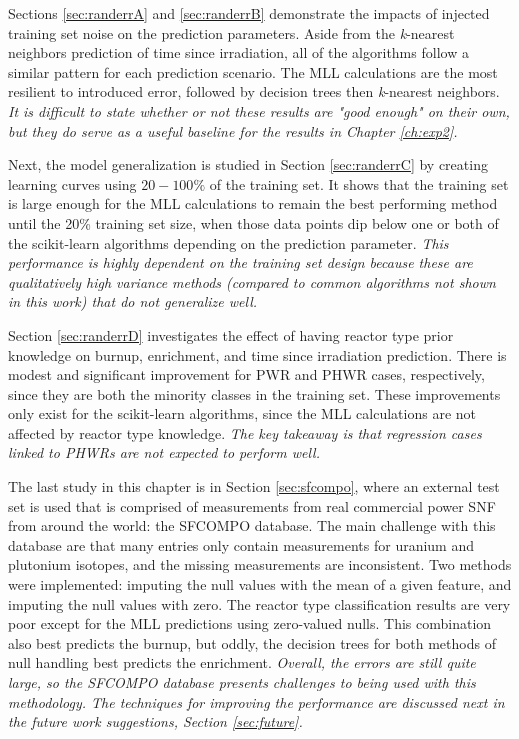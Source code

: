 Sections \ref{sec:randerrA} and \ref{sec:randerrB} demonstrate the impacts of
injected training set noise on the prediction parameters. Aside from the
\textit{k}-nearest neighbors prediction of time since irradiation, all of the
algorithms follow a similar pattern for each prediction scenario.  The
\gls{MLL} calculations are the most resilient to introduced error, followed by
decision trees then \textit{k}-nearest neighbors.  \textit{It is difficult to
state whether or not these results are "good enough" on their own, but they do
serve as a useful baseline for the results in Chapter \ref{ch:exp2}.} 

Next, the model generalization is studied in Section \ref{sec:randerrC} by
creating learning curves using $20-100\%$ of the training set.  It shows that
the training set is large enough for the \gls{MLL} calculations to remain the
best performing method until the 20\% training set size, when those data points
dip below one or both of the scikit-learn algorithms depending on the
prediction parameter.  \textit{This performance is highly dependent on the
training set design because these are qualitatively high variance methods
(compared to common algorithms not shown in this work) that do not generalize
well.}

Section \ref{sec:randerrD} investigates the effect of having reactor type prior
knowledge on burnup, enrichment, and time since irradiation prediction.  There
is modest and significant improvement for \gls{PWR} and \gls{PHWR} cases,
respectively, since they are both the minority classes in the training set.
These improvements only exist for the scikit-learn algorithms, since the
\gls{MLL} calculations are not affected by reactor type knowledge. \textit{The
key takeaway is that regression cases linked to \glspl{PHWR} are not expected
to perform well.}

The last study in this chapter is in Section \ref{sec:sfcompo}, where an
external test set is used that is comprised of measurements from real
commercial power \gls{SNF} from around the world: the \gls{SFCOMPO} database.
The main challenge with this database are that many entries only contain
measurements for uranium and plutonium isotopes, and the missing measurements
are inconsistent. Two methods were implemented: imputing the null values with
the mean of a given feature, and imputing the null values with zero.  The
reactor type classification results are very poor except for the \gls{MLL}
predictions using zero-valued nulls.  This combination also best predicts the
burnup, but oddly, the decision trees for both methods of null handling best
predicts the enrichment.  \textit{Overall, the errors are still quite large, so
the \gls{SFCOMPO} database presents challenges to being used with this
methodology. The techniques for improving the performance are discussed next in
the future work suggestions, Section \ref{sec:future}.}

